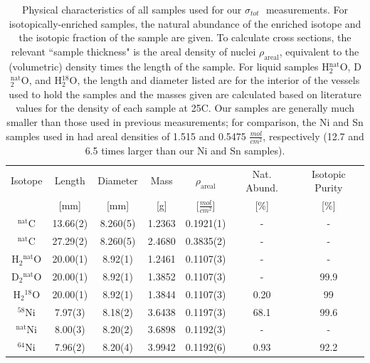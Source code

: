 \documentclass[twocolumn,secnumarabic,amssymb, nobibnotes, aps, prl,
superscriptaddress, nobalancelastpage]{revtex4}
\newcommand{\tots}{\ensuremath{\sigma_{tot}}\,\,}
\begin{document}
\begin{table}[ht]
    \caption{
        Physical characteristics of all samples used for our \tots
        measurements. For isotopically-enriched samples, the natural abundance
        of the enriched isotope and the isotopic fraction of the sample are
        given. To calculate cross sections, the relevant ``sample thickness" is the areal
        density of nuclei $\rho_{\text{areal}}$, equivalent to
        the (volumetric) density times the length of the sample. For liquid
        samples H$_{2}^{\text{nat}}$O, D$_{2}^{\text{nat}}$O, and H$_{2}^{18}$O,
        the length and diameter listed are for the interior of the vessels
        used to hold the samples and the masses given are calculated based on 
        literature values for the density of each sample at 25\textdegree{}C.
        Our samples are generally much smaller than those used in previous
        measurements; for comparison, the Ni and Sn samples used in \cite{Abfalterer2001,
        Finlay1993} had areal densities of 1.515 and 0.5475
        $\frac{mol}{cm^{2}}$, respectively (12.7 and 6.5 times larger than our
    Ni and Sn samples).}
    \label{tab:title}
    \label{SampleCharacteristics}

    \label{SampleTable}
    \begin{center}
        \begin{tabular}{ c c c c c c c }
            \hline
            Isotope & Length & Diameter
            & Mass & $\rho_{\text{areal}}$ & Nat. Abund. & Isotopic Purity\\
                 & [mm] & [mm] & [g] & [$\frac{mol}{cm^{2}}$] & [\%] & [\%]\\
            \hline

            $^{\text{nat}}$C & 13.66(2) & 8.260(5) & 1.2363
            & 0.1921(1) & - & -\\
            $^{\text{nat}}$C & 27.29(2) & 8.260(5) & 2.4680
            & 0.3835(2) & - & -\\

            H$_{2}$$^{\text{nat}}$O & 20.00(1) & 8.92(1) & 1.2461 & 0.1107(3) & - &
            - \\
            D$_{2}$$^{\text{nat}}$O & 20.00(1) & 8.92(1) & 1.3852 & 0.1107(3) & - &
            99.9 \\
            H$_{2}$$^{18}$O & 20.00(1) & 8.92(1) & 1.3844 & 0.1107(3) & 0.20 & 99\\

            $^{58}$Ni & 7.97(3)& 8.18(2) &
            3.6438 & 0.1197(3)& 68.1 & 99.6 \\
            $^{\text{nat}}$Ni & 8.00(3) & 8.20(2) &
            3.6898 & 0.1192(3)& - & -\\
            $^{64}$Ni & 7.96(2) & 8.20(4) &
            3.9942 & 0.1192(6) & 0.93 & 92.2\\


\end{tabular}
\end{center}
\end{table}
\end{document}
